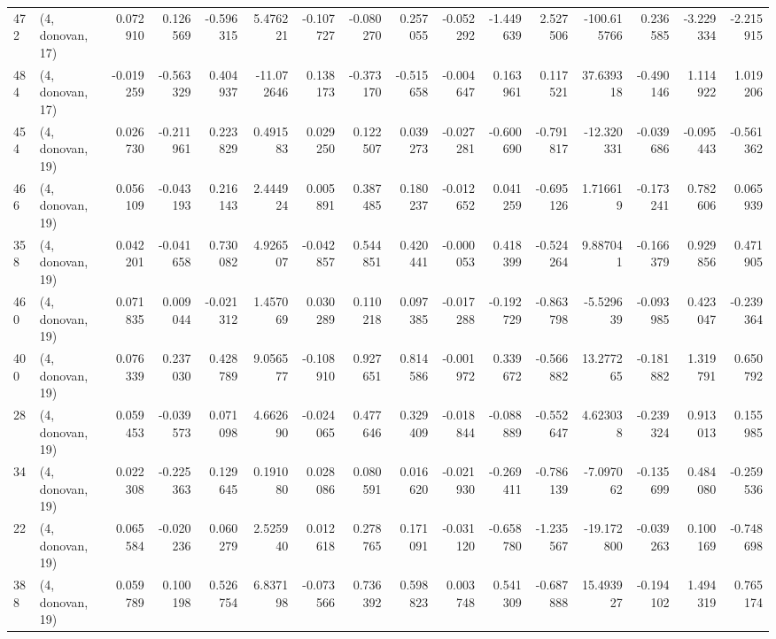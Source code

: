 \begin{tabular}{llrrrrrrrrrrrrrr}
472 &  (4, donovan, 17) &   0.072910 &  0.126569 & -0.596315 &   5.476221 & -0.107727 &  -0.080270 &  0.257055 & -0.052292 & -1.449639 &  2.527506 &  -100.615766 &   0.236585 &  -3.229334 &  -2.215915 \\
484 &  (4, donovan, 17) &  -0.019259 & -0.563329 &  0.404937 & -11.072646 &  0.138173 &  -0.373170 & -0.515658 & -0.004647 &  0.163961 &  0.117521 &    37.639318 &  -0.490146 &   1.114922 &   1.019206 \\
454 &  (4, donovan, 19) &   0.026730 & -0.211961 &  0.223829 &   0.491583 &  0.029250 &   0.122507 &  0.039273 & -0.027281 & -0.600690 & -0.791817 &   -12.320331 &  -0.039686 &  -0.095443 &  -0.561362 \\
466 &  (4, donovan, 19) &   0.056109 & -0.043193 &  0.216143 &   2.444924 &  0.005891 &   0.387485 &  0.180237 & -0.012652 &  0.041259 & -0.695126 &     1.716619 &  -0.173241 &   0.782606 &   0.065939 \\
358 &  (4, donovan, 19) &   0.042201 & -0.041658 &  0.730082 &   4.926507 & -0.042857 &   0.544851 &  0.420441 & -0.000053 &  0.418399 & -0.524264 &     9.887041 &  -0.166379 &   0.929856 &   0.471905 \\
460 &  (4, donovan, 19) &   0.071835 &  0.009044 & -0.021312 &   1.457069 &  0.030289 &   0.110218 &  0.097385 & -0.017288 & -0.192729 & -0.863798 &    -5.529639 &  -0.093985 &   0.423047 &  -0.239364 \\
400 &  (4, donovan, 19) &   0.076339 &  0.237030 &  0.428789 &   9.056577 & -0.108910 &   0.927651 &  0.814586 & -0.001972 &  0.339672 & -0.566882 &    13.277265 &  -0.181882 &   1.319791 &   0.650792 \\
28  &  (4, donovan, 19) &   0.059453 & -0.039573 &  0.071098 &   4.662690 & -0.024065 &   0.477646 &  0.329409 & -0.018844 & -0.088889 & -0.552647 &     4.623038 &  -0.239324 &   0.913013 &   0.155985 \\
34  &  (4, donovan, 19) &   0.022308 & -0.225363 &  0.129645 &   0.191080 &  0.028086 &   0.080591 &  0.016620 & -0.021930 & -0.269411 & -0.786139 &    -7.097062 &  -0.135699 &   0.484080 &  -0.259536 \\
22  &  (4, donovan, 19) &   0.065584 & -0.020236 &  0.060279 &   2.525940 &  0.012618 &   0.278765 &  0.171091 & -0.031120 & -0.658780 & -1.235567 &   -19.172800 &  -0.039263 &   0.100169 &  -0.748698 \\
388 &  (4, donovan, 19) &   0.059789 &  0.100198 &  0.526754 &   6.837198 & -0.073566 &   0.736392 &  0.598823 &  0.003748 &  0.541309 & -0.687888 &    15.493927 &  -0.194102 &   1.494319 &   0.765174 \\

\end{tabular}
